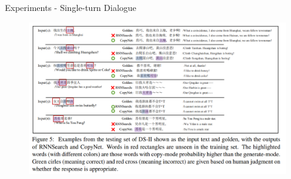 \documentclass{beamer}
\begin{document}
\begin{frame}{Experiments - Single-turn Dialogue}
    \begin{figure}
        \centering
        \includegraphics[height=0.8\textheight]{dia_ex.PNG}
    \end{figure}
\end{frame}
\end{document}
